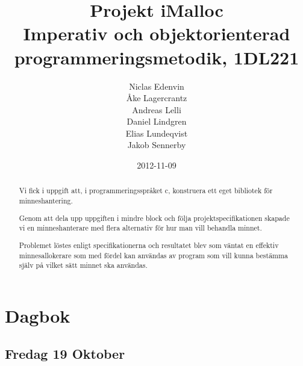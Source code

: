 \documentclass{article}
\title{
  Projekt iMalloc \\
  Imperativ och objektorienterad programmeringsmetodik, 1DL221
}
\author{
  Niclas Edenvin \\
  Åke Lagercrantz \\
  Andreas Lelli \\
  Daniel Lindgren \\
  Elias Lundeqvist \\
  Jakob Sennerby
}
\date{2012-11-09}
\begin{document}
\maketitle

\vspace{4cm}

\begin{abstract}
  \centering
  \begin{minipage}{0.75\textwidth}
  { 
  \parskip5pt

  \noindent Vi fick i uppgift att, i programmeringsspråket c, konstruera ett eget bibliotek för minneshantering.

  \noindent  Genom att dela upp uppgiften i mindre block och följa projektspecifikationen skapade vi en minneshanterare med flera alternativ för hur man vill behandla minnet.

  \noindent  Problemet löstes enligt specifikationerna och resultatet blev som väntat en effektiv minnesallokerare som med fördel kan användas av program som vill kunna bestämma själv på vilket sätt minnet ska användas.
  }

  \end{minipage}


\end{abstract}


\newpage

\tableofcontents

\newpage





\section{Dagbok}

\subsection{Fredag 19 Oktober}
\end{document}

